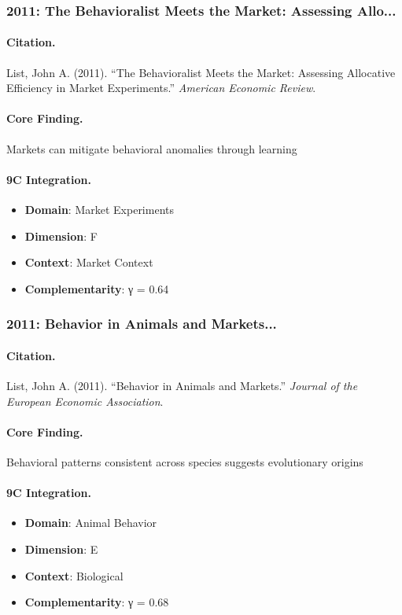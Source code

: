 \subsubsection{2011: The Behavioralist Meets the Market: Assessing Allo...}

\paragraph{Citation.}
List, John A. (2011). ``The Behavioralist Meets the Market: Assessing Allocative Efficiency in Market Experiments.''
\textit{American Economic Review}.

\paragraph{Core Finding.}
Markets can mitigate behavioral anomalies through learning

\paragraph{9C Integration.}
\begin{itemize}[nosep]
  \item \textbf{Domain}: Market Experiments
  \item \textbf{Dimension}: F
  \item \textbf{Context}: Market Context
  \item \textbf{Complementarity}: γ = 0.64
\end{itemize}


\subsubsection{2011: Behavior in Animals and Markets...}

\paragraph{Citation.}
List, John A. (2011). ``Behavior in Animals and Markets.''
\textit{Journal of the European Economic Association}.

\paragraph{Core Finding.}
Behavioral patterns consistent across species suggests evolutionary origins

\paragraph{9C Integration.}
\begin{itemize}[nosep]
  \item \textbf{Domain}: Animal Behavior
  \item \textbf{Dimension}: E
  \item \textbf{Context}: Biological
  \item \textbf{Complementarity}: γ = 0.68
\end{itemize}


